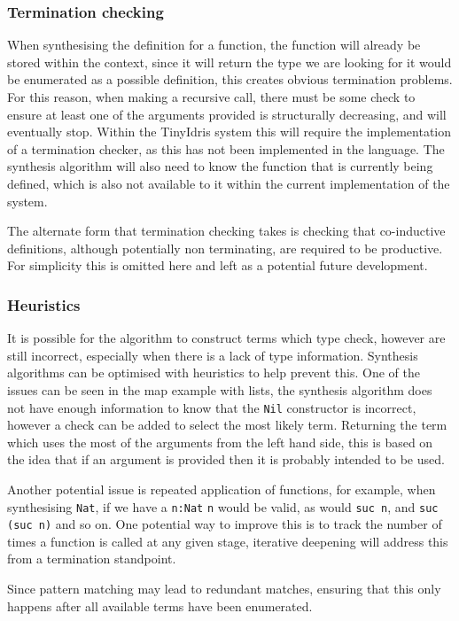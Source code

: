 \documentclass[a4paper]{article}
\begin{document}
\subsubsection{Termination checking}
\label{sec:orgda881b6}
When synthesising the definition for a function, the function will already be stored within the context, since it will 
return the type we are looking for it would be enumerated as a possible definition, this creates obvious termination 
problems. For this reason, when making a recursive call, there must be some check to ensure at least one of the 
arguments provided is structurally decreasing, and will eventually stop. Within the TinyIdris system this will require the 
implementation of a termination checker, as this has not been implemented in the language. The synthesis algorithm will also need to know 
the function that is currently being defined, which is also not available to it within the current implementation of the 
system. 

The alternate form that termination checking takes is checking that co-inductive definitions, although potentially non 
terminating, are required to be productive. For simplicity this is omitted here and left as a potential future development.
\subsubsection{Heuristics}
\label{sec:org5ff38b1}
It is possible for the algorithm to construct terms which type check, however are still incorrect, especially 
when there is a lack of type information. Synthesis algorithms can be optimised with heuristics to help prevent this.
One of the issues can be seen in the map example with lists, the synthesis algorithm does not have enough information to 
know that the \texttt{Nil} constructor is incorrect, however a check can be added to select the most likely term.
Returning the term which uses the most of the arguments from the left hand side, this is based on the idea that 
if an argument is provided then it is probably intended to be used. 

Another potential issue is repeated application of functions, for example, when synthesising \texttt{Nat}, if we have a \texttt{n:Nat}
\texttt{n} would be valid, as would \texttt{suc n}, and \texttt{suc (suc n)} and so on. One potential way to improve this is to track the number 
of times a function is called at any given stage, iterative deepening will address this from a termination standpoint.

Since pattern matching may lead to redundant matches, ensuring that this only happens after all available terms 
have been enumerated. 
\end{document}
